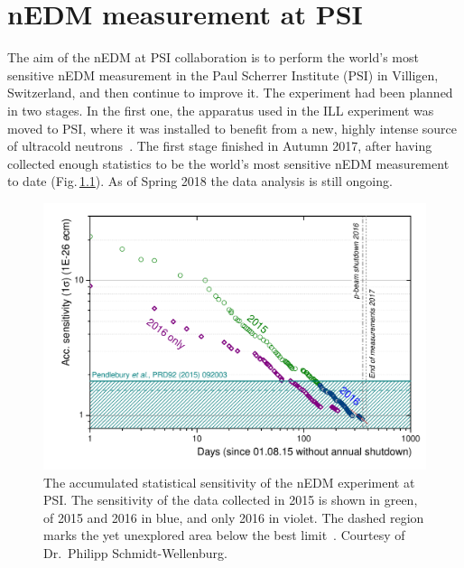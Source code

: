 \chapter{nEDM measurement at PSI}
\label{ch:nedm-at-psi-apparatus}

The aim of the nEDM at PSI collaboration is to perform the world's most sensitive nEDM measurement in the Paul Scherrer Institute (PSI) in Villigen, Switzerland, and then continue to improve it.
The experiment had been planned in two stages.
In the first one, the apparatus used in the ILL experiment was moved to PSI, where it was installed to benefit from a new, highly intense source of ultracold neutrons~\cite{Lauss2014}.
The first stage finished in Autumn 2017, after having collected enough statistics to be the world's most sensitive nEDM measurement to date (Fig.\,\ref{fig:nEDM_accumulated_sensitivity}).
As of Spring 2018 the data analysis is still ongoing.

\begin{figure}
  \centering
  \includegraphics[width=\linewidth]{gfx/nEDMatPSI/accumulated_sensitivity.pdf}
  \caption{The accumulated statistical sensitivity of the nEDM experiment at PSI\@.
  The sensitivity of the data collected in 2015 is shown in green, of 2015 and 2016 in blue, and only 2016 in violet.
  The dashed region marks the yet unexplored area below the best limit~\cite{Pendlebury2015}.
  Courtesy of Dr.\ Philipp Schmidt-Wellenburg.}\label{fig:nEDM_accumulated_sensitivity}
\end{figure}

